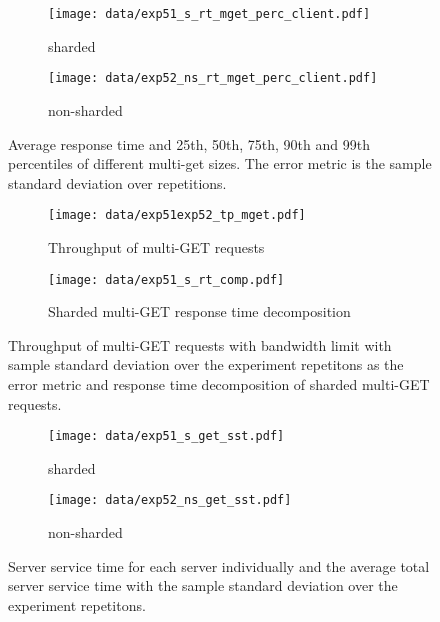 \documentclass[report.tex]{subfiles}
\begin{document}
\begin{figure}[H]
	\begin{subfigure}[b]{.49\linewidth}
		\centering
		\texttt{[image: data/exp51\_s\_rt\_mget\_perc\_client.pdf]}
		\caption{sharded}\label{exp51_s_rt_mget_perc}
	\end{subfigure}\hfill
	\begin{subfigure}[b]{.49\linewidth}
		\centering
		\texttt{[image: data/exp52\_ns\_rt\_mget\_perc\_client.pdf]}
		\caption{non-sharded}\label{exp52_ns_rt_mget_perc}
	\end{subfigure}%
	\caption{Average response time and 25th, 50th, 75th, 90th and 99th percentiles of different multi-get sizes. The error metric is the sample standard deviation over repetitions.}\label{exp5_rt_mget_perc}
\end{figure}


\begin{figure}[H]
	\begin{subfigure}[b]{.49\linewidth}
		\centering
		\texttt{[image: data/exp51exp52\_tp\_mget.pdf]}
		\caption{Throughput of multi-GET requests }\label{exp5_tp}
	\end{subfigure}\hfill
	\begin{subfigure}[b]{.49\linewidth}
		\centering
		\texttt{[image: data/exp51\_s\_rt\_comp.pdf]}
		\caption{Sharded multi-GET response time decomposition}\label{exp51_s_rt_comp}
	\end{subfigure}%
	\caption{Throughput of multi-GET requests with bandwidth limit with sample standard deviation over the experiment repetitons as the error metric and response time decomposition of sharded multi-GET requests.}
\end{figure}


\begin{figure}[H]
	\begin{subfigure}[b]{.49\linewidth}
		\centering
		\texttt{[image: data/exp51\_s\_get\_sst.pdf]}
		\caption{sharded}\label{exp51_s_get_sst}
	\end{subfigure}\hfill
	\begin{subfigure}[b]{.49\linewidth}
		\centering
		\texttt{[image: data/exp52\_ns\_get\_sst.pdf]}
		\caption{non-sharded}\label{exp52_s_get_sst}
	\end{subfigure}%
	\caption{Server service time for each server individually and the average total server service time with the sample standard deviation over the experiment repetitons.}
\end{figure}
\end{document}
